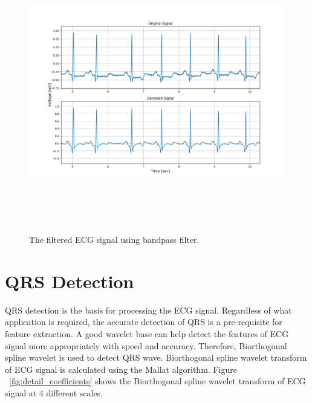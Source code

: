 \begin{figure}[h]
	\centering
	\includegraphics[width=15cm,height=12cm,keepaspectratio=true]{images/bandpass_denoised_1}
	\caption{
		The filtered ECG signal using bandpass filter.
	}
	\label{fig:bandpass_denoised}
\end{figure}


\section{QRS Detection}\label{sec:ecg_det}
QRS detection is the basis for processing the ECG signal. Regardless of what application is required, the accurate detection of QRS is a pre-requisite for feature extraction. A good wavelet base can help detect the features of ECG signal more appropriately with speed and accuracy. Therefore, Biorthogonal spline wavelet is used to detect QRS wave. Biorthogonal spline wavelet transform of ECG signal is calculated using the Mallat algorithm. Figure ~\ref{fig:detail_coefficients} shows the Biorthogonal spline wavelet transform of ECG signal at 4 different scales.

